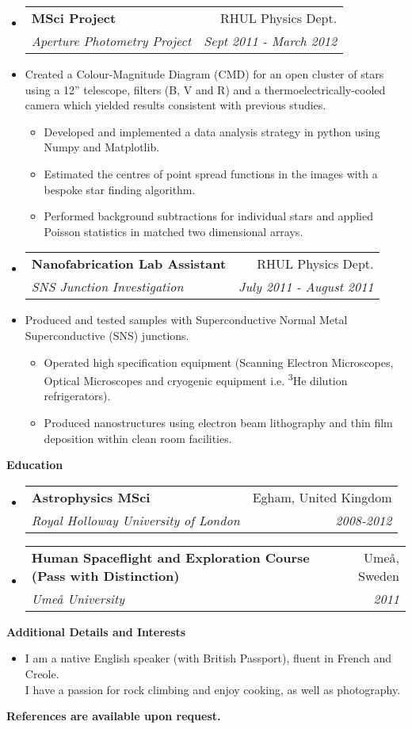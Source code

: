 \documentclass[letterpaper,11pt]{article}
\makeatletter
\newcommand{\resitem}[1]{\item #1 \vspace{-2pt}}
\newcommand{\resheading}[1]{{\large \colorbox{mygrey}
			{\begin{minipage}{\textwidth}
					{\textbf{#1 \vphantom{p\^{E}}}}
		\end{minipage}}}
	}
\newcommand{\ressubheading}[4]{
		\begin{tabular*}{180mm}{l@{\extracolsep{\fill}}r}
			\textbf{#1} & #2 \\
			\textit{#3} & \textit{#4} \\
		\end{tabular*}\vspace{-6pt}
	}
\newcommand{\resdescription}[1]{#1 \vspace{-0mm}}
\makeatother
\begin{document}
\begin{itemize}
		\item[]
			\ressubheading{MSci Project}{RHUL Physics Dept.}{Aperture Photometry Project}{Sept 2011 - March 2012}
		\item[]
			\resdescription{Created a Colour-Magnitude Diagram (CMD) for an open cluster of stars using a 12'' telescope, filters (B, V and R) and a thermoelectrically-cooled camera which yielded results consistent with previous studies.}
			\begin{itemize}
					\resitem{Developed and implemented a data analysis strategy in python using Numpy and Matplotlib.}
					\resitem{Estimated the centres of point spread functions in the images with a bespoke star finding algorithm.}
					\resitem{Performed background subtractions for individual stars and applied Poisson statistics in matched two dimensional arrays.}
			\end{itemize}

		\item[]
			\ressubheading{Nanofabrication Lab Assistant}{RHUL Physics Dept.}{SNS Junction Investigation}{July 2011 - August 2011}
		\item[]
			\resdescription{Produced and tested samples with Superconductive Normal Metal Superconductive (SNS) junctions.}
			\begin{itemize}
					\resitem{Operated high specification equipment (Scanning Electron Microscopes, Optical Microscopes and cryogenic equipment i.e. \textsuperscript{3}He dilution refrigerators).}
					\resitem{Produced nanostructures using electron beam lithography and thin film deposition within clean room facilities.}
			\end{itemize}

	\end{itemize}

	\resheading{Education}
	\begin{itemize}
		\item[]
			\ressubheading{Astrophysics MSci }{Egham, United Kingdom}{Royal Holloway University of London}{2008-2012}

		\item[]
			\ressubheading{Human Spaceflight and Exploration Course (Pass with Distinction)}{Ume\r{a}, Sweden}{Ume\r{a} University}{2011}

	\end{itemize}

	\resheading{Additional Details and Interests}
	\begin{itemize}
		\item[] I am a native English speaker (with British Passport), fluent in French and Creole.\\
			I have a passion for rock climbing and enjoy cooking, as well as photography. \\
	\end{itemize}

	\textbf{References are available upon request.}

	
\end{document}
